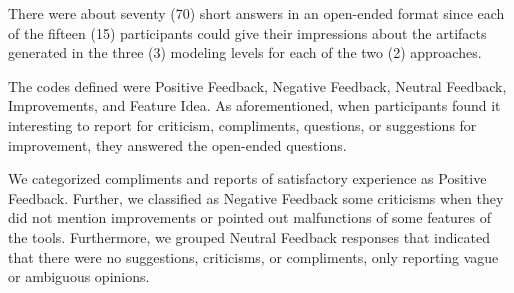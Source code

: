There were about seventy (70) short answers in an open-ended format since each of the fifteen (15) participants could give their impressions about the artifacts generated in the three (3) modeling levels for each of the two (2) approaches.

The codes defined were Positive Feedback, Negative Feedback, Neutral Feedback, Improvements, and Feature Idea.
As aforementioned, when participants found it interesting to report for criticism, compliments, questions, or suggestions for improvement, they answered the open-ended questions.

We categorized compliments and reports of satisfactory experience as Positive Feedback.
Further, we classified as Negative Feedback some criticisms when they did not mention improvements or pointed out malfunctions of some features of the tools.
Furthermore, we grouped Neutral Feedback responses that indicated that there were no suggestions, criticisms, or compliments, only reporting vague or ambiguous opinions.

